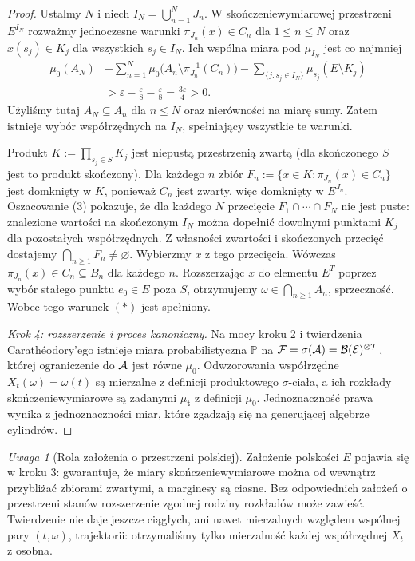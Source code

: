 \documentclass[11pt,a4paper,oneside]{report}
\numberwithin{equation}{chapter}
\theoremstyle{plain}
\theoremstyle{definition}
\theoremstyle{remark}
\newtheorem{uwaga}{Uwaga}[chapter]
\newcommand{\Prob}{\mathbb{P}}
\newcommand{\calF}{\mathcal{F}}
\newcommand{\calB}{\mathcal{B}}
\begin{document}
\begin{proof}
Ustalmy $N$ i niech $I_N=\bigcup_{n=1}^N J_n$.
W skończeniewymiarowej przestrzeni $E^{I_N}$
rozważmy jednoczesne warunki
$\pi_{J_n}(x)\in C_n$ dla $1\le n\le N$
oraz $x(s_j)\in K_j$ dla wszystkich $s_j\in I_N$.
Ich wspólna miara pod $\mu_{I_N}$ jest co najmniej
\[
\begin{aligned}
\mu_0(A_N)
&-\sum_{n=1}^N \mu_0\big(A_n\setminus\pi_{J_n}^{-1}(C_n)\big)
-\sum_{\{j:s_j\in I_N\}}\mu_{s_j}(E\setminus K_j)\\
&>\varepsilon-\frac\varepsilon8-\frac\varepsilon8
=\frac{3\varepsilon}{4}>0.
\end{aligned}
\tag{3}
\]
Użyliśmy tutaj $A_N\subseteq A_n$ dla $n\le N$ oraz
nierówności na miarę sumy. Zatem istnieje wybór
współrzędnych na $I_N$, spełniający wszystkie te warunki.

Produkt $K:=\prod_{s_j\in S}K_j$ jest niepustą przestrzenią
zwartą (dla skończonego $S$ jest to produkt skończony).
Dla każdego $n$ zbiór
$F_n:=\{x\in K:\pi_{J_n}(x)\in C_n\}$
jest domknięty w $K$, ponieważ $C_n$ jest zwarty,
więc domknięty w $E^{J_n}$. Oszacowanie (3) pokazuje,
że dla każdego $N$ przecięcie $F_1\cap\cdots\cap F_N$
nie jest puste: znalezione wartości na skończonym $I_N$
można dopełnić dowolnymi punktami $K_j$ dla
pozostałych współrzędnych. Z własności zwartości
i skończonych przecięć dostajemy
$\bigcap_{n\ge1}F_n\ne\varnothing$.
Wybierzmy $x$ z tego przecięcia. Wówczas
$\pi_{J_n}(x)\in C_n\subseteq B_n$ dla każdego $n$.
Rozszerzając $x$ do elementu $E^T$ poprzez wybór
stałego punktu $e_0\in E$ poza $S$, otrzymujemy
$\omega\in\bigcap_{n\ge1}A_n$, sprzeczność.
Wobec tego warunek $(*)$ jest spełniony.

\emph{Krok 4: rozszerzenie i proces kanoniczny.}
Na mocy kroku 2 i twierdzenia Carathéodory'ego istnieje
miara probabilistyczna $\Prob$ na
$\calF=\sigma(\cal A)=\calB(E)^{\otimes T}$,
której ograniczenie do $\cal A$ jest równe $\mu_0$.
Odwzorowania współrzędne $X_t(\omega)=\omega(t)$ są
mierzalne z definicji produktowego $\sigma$-ciała,
a ich rozkłady skończeniewymiarowe są zadanymi
$\mu_{\mathbf t}$ z definicji $\mu_0$.
Jednoznaczność prawa wynika z jednoznaczności miar,
które zgadzają się na generującej algebrze cylindrów.
\end{proof}

\begin{uwaga}[Rola założenia o przestrzeni polskiej]
Założenie polskości $E$ pojawia się w kroku 3: gwarantuje,
że miary skończeniewymiarowe można od wewnątrz
przybliżać zbiorami zwartymi, a marginesy są ciasne.
Bez odpowiednich założeń o przestrzeni stanów
rozszerzenie zgodnej rodziny rozkładów może zawieść.
Twierdzenie nie daje jeszcze ciągłych, ani nawet
mierzalnych względem wspólnej pary $(t,\omega)$,
trajektorii: otrzymaliśmy tylko mierzalność każdej
współrzędnej $X_t$ z osobna.
\end{uwaga}
\end{document}
